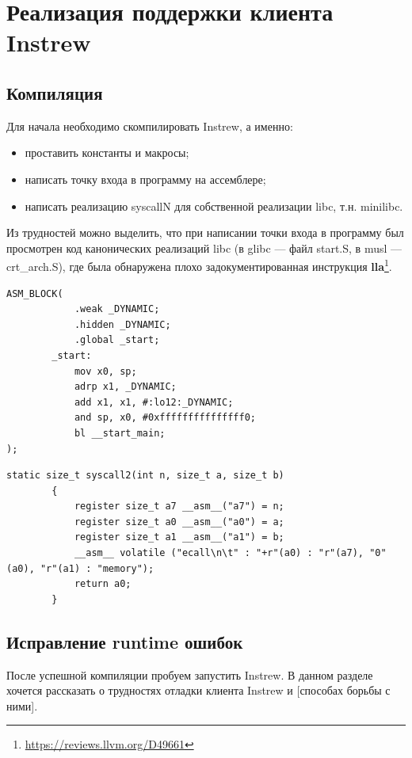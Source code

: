 
\section{Реализация поддержки клиента Instrew}
\subsection{Компиляция}
Для начала необходимо скомпилировать Instrew, а именно:
\begin{itemize}
    \item проставить константы и макросы;
    \item написать точку входа в программу на ассемблере;
    \item написать реализацию syscallN для собственной реализации libc, т.н. minilibc.
\end{itemize}

Из трудностей можно выделить, что при написании точки входа в программу был просмотрен код канонических реализаций libc (в glibc --- файл start.S, в musl --- crt\_arch.S), где была обнаружена плохо задокументированная инструкция \textbf{lla}\footnote{\href{https://reviews.llvm.org/D49661}{https://reviews.llvm.org/D49661}}.

\begin{lstlisting}[caption={Заголовок}, frame=single, breaklines, basicstyle=\footnotesize]
        ASM_BLOCK(
            .weak _DYNAMIC;
            .hidden _DYNAMIC;
            .global _start;
        _start:
            mov x0, sp;
            adrp x1, _DYNAMIC;
            add x1, x1, #:lo12:_DYNAMIC;
            and sp, x0, #0xfffffffffffffff0;
            bl __start_main;
);\end{lstlisting}

\begin{lstlisting}[caption={Системный вызов}, frame=single, breaklines, basicstyle=\footnotesize]
        static size_t syscall2(int n, size_t a, size_t b)
        {
        	register size_t a7 __asm__("a7") = n;
        	register size_t a0 __asm__("a0") = a;
        	register size_t a1 __asm__("a1") = b;
        	__asm__ volatile ("ecall\n\t" : "+r"(a0) : "r"(a7), "0"(a0), "r"(a1) : "memory");
        	return a0;
        }

\end{lstlisting}

\subsection{Исправление runtime ошибок}
После успешной компиляции пробуем запустить Instrew. В данном разделе хочется рассказать о трудностях отладки клиента Instrew и [способах борьбы с ними].

